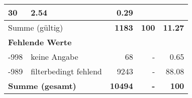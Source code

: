 \begin{longtable}{lXrrr}
       \num{30} &
       \num[round-mode=places,round-precision=2]{2,54} &
         \num[round-mode=places,round-precision=2]{0,29} \\
     \midrule
     \multicolumn{2}{l}{Summe (gültig)} &
       \textbf{\num{1183}} &
     \textbf{100} &
       \textbf{\num[round-mode=places,round-precision=2]{11,27}} \\
     \multicolumn{5}{l}{\textbf{Fehlende Werte}}\\
       -998 &
       keine Angabe &
         \num{68} &
        - &
         \num[round-mode=places,round-precision=2]{0,65} \\
       -989 &
       filterbedingt fehlend &
         \num{9243} &
        - &
         \num[round-mode=places,round-precision=2]{88,08} \\
     \midrule
     \multicolumn{2}{l}{\textbf{Summe (gesamt)}} &
          \textbf{\num{10494}} &
        \textbf{-} &
        \textbf{100} \\
     \bottomrule
     \end{longtable}
     
